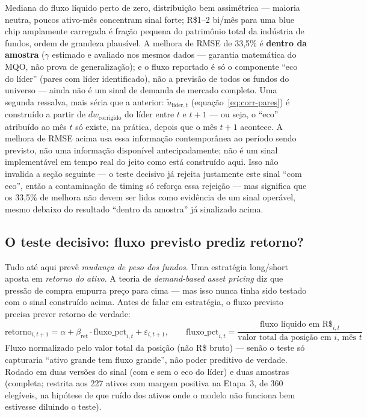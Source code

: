 \documentclass[11pt,a4paper]{article}
\begin{document}
Mediana do fluxo líquido perto de zero, distribuição bem assimétrica --- maioria neutra, poucos
ativo-mês concentram sinal forte; R\$1--2 bi/mês para uma blue chip amplamente carregada é
fração pequena do patrimônio total da indústria de fundos, ordem de grandeza plausível. A
melhora de RMSE de 33,5\% é \textbf{dentro da amostra} ($\gamma$ estimado e avaliado nos mesmos
dados --- garantia matemática do MQO, não prova de generalização); e o fluxo reportado é só o
componente ``eco do líder'' (pares com líder identificado), não a previsão de todos os fundos
do universo --- ainda não é um sinal de demanda de mercado completo. Uma segunda ressalva, mais
séria que a anterior: $\tilde u_{\text{líder},t}$ (equação~\eqref{eq:corr-pares}) é construído a partir
de $dw_{\text{corrigido}}$ do líder entre $t$ e $t+1$ --- ou seja, o ``eco'' atribuído ao mês $t$
só existe, na prática, depois que o mês $t+1$ acontece. A melhora de RMSE acima usa essa
informação contemporânea ao período sendo previsto, não uma informação disponível
antecipadamente; não é um sinal implementável em tempo real do jeito como está construído aqui.
Isso não invalida a seção seguinte --- o teste decisivo já rejeita justamente este sinal ``com
eco'', então a contaminação de timing só reforça essa rejeição --- mas significa que os 33,5\% de
melhora não devem ser lidos como evidência de um sinal operável, mesmo debaixo do resultado
``dentro da amostra'' já sinalizado acima.

\FloatBarrier
\subsection{O teste decisivo: fluxo previsto prediz retorno?}
\label{sec:teste-decisivo}

Tudo até aqui prevê \emph{mudança de peso dos fundos}. Uma estratégia long/short aposta em
\emph{retorno do ativo}. A teoria de \emph{demand-based asset pricing} \cite{koijen2019} diz que
pressão de compra empurra preço para cima --- mas isso nunca tinha sido testado com o sinal construído
acima. Antes de falar em estratégia, o fluxo previsto precisa prever retorno de verdade:
\begin{equation}
\text{retorno}_{i,t+1} = \alpha + \beta_{\text{ret}}\cdot\text{fluxo\_pct}_{i,t} + \varepsilon_{i,t+1},
\qquad
\text{fluxo\_pct}_{i,t} = \frac{\text{fluxo líquido em R\$}_{i,t}}{\text{valor total da posição em } i\text{, mês } t}
\label{eq:fluxo-retorno}
\end{equation}
Fluxo normalizado pelo valor total da posição (não R\$ bruto) --- senão o teste só capturaria
``ativo grande tem fluxo grande'', não poder preditivo de verdade. Rodado em duas versões do
sinal (com e sem o eco do líder) e duas amostras (completa; restrita aos 227 ativos com margem
positiva na Etapa~3, de 360 elegíveis, na hipótese de que ruído dos ativos onde o modelo não
funciona bem estivesse diluindo o teste).
\end{document}
